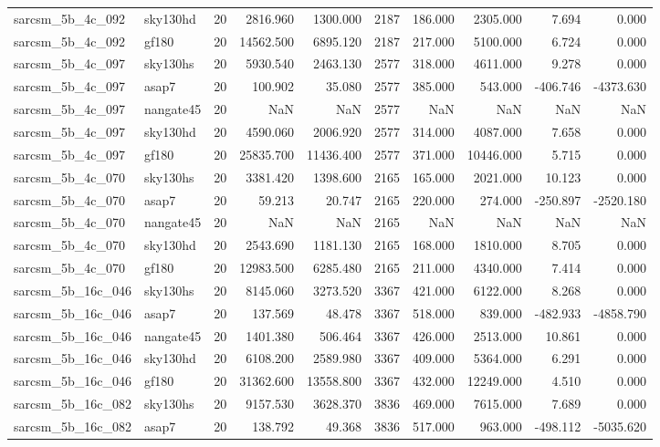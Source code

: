 \begin{longtable}{llrrrrrrrr}
sarcsm\_5b\_4c\_092 & sky130hd & 20 & 2816.960 & 1300.000 & 2187 & 186.000 & 2305.000 & 7.694 & 0.000 \\
sarcsm\_5b\_4c\_092 & gf180 & 20 & 14562.500 & 6895.120 & 2187 & 217.000 & 5100.000 & 6.724 & 0.000 \\
sarcsm\_5b\_4c\_097 & sky130hs & 20 & 5930.540 & 2463.130 & 2577 & 318.000 & 4611.000 & 9.278 & 0.000 \\
sarcsm\_5b\_4c\_097 & asap7 & 20 & 100.902 & 35.080 & 2577 & 385.000 & 543.000 & -406.746 & -4373.630 \\
sarcsm\_5b\_4c\_097 & nangate45 & 20 & NaN & NaN & 2577 & NaN & NaN & NaN & NaN \\
sarcsm\_5b\_4c\_097 & sky130hd & 20 & 4590.060 & 2006.920 & 2577 & 314.000 & 4087.000 & 7.658 & 0.000 \\
sarcsm\_5b\_4c\_097 & gf180 & 20 & 25835.700 & 11436.400 & 2577 & 371.000 & 10446.000 & 5.715 & 0.000 \\
sarcsm\_5b\_4c\_070 & sky130hs & 20 & 3381.420 & 1398.600 & 2165 & 165.000 & 2021.000 & 10.123 & 0.000 \\
sarcsm\_5b\_4c\_070 & asap7 & 20 & 59.213 & 20.747 & 2165 & 220.000 & 274.000 & -250.897 & -2520.180 \\
sarcsm\_5b\_4c\_070 & nangate45 & 20 & NaN & NaN & 2165 & NaN & NaN & NaN & NaN \\
sarcsm\_5b\_4c\_070 & sky130hd & 20 & 2543.690 & 1181.130 & 2165 & 168.000 & 1810.000 & 8.705 & 0.000 \\
sarcsm\_5b\_4c\_070 & gf180 & 20 & 12983.500 & 6285.480 & 2165 & 211.000 & 4340.000 & 7.414 & 0.000 \\
sarcsm\_5b\_16c\_046 & sky130hs & 20 & 8145.060 & 3273.520 & 3367 & 421.000 & 6122.000 & 8.268 & 0.000 \\
sarcsm\_5b\_16c\_046 & asap7 & 20 & 137.569 & 48.478 & 3367 & 518.000 & 839.000 & -482.933 & -4858.790 \\
sarcsm\_5b\_16c\_046 & nangate45 & 20 & 1401.380 & 506.464 & 3367 & 426.000 & 2513.000 & 10.861 & 0.000 \\
sarcsm\_5b\_16c\_046 & sky130hd & 20 & 6108.200 & 2589.980 & 3367 & 409.000 & 5364.000 & 6.291 & 0.000 \\
sarcsm\_5b\_16c\_046 & gf180 & 20 & 31362.600 & 13558.800 & 3367 & 432.000 & 12249.000 & 4.510 & 0.000 \\
sarcsm\_5b\_16c\_082 & sky130hs & 20 & 9157.530 & 3628.370 & 3836 & 469.000 & 7615.000 & 7.689 & 0.000 \\
sarcsm\_5b\_16c\_082 & asap7 & 20 & 138.792 & 49.368 & 3836 & 517.000 & 963.000 & -498.112 & -5035.620 \\

\end{longtable}
